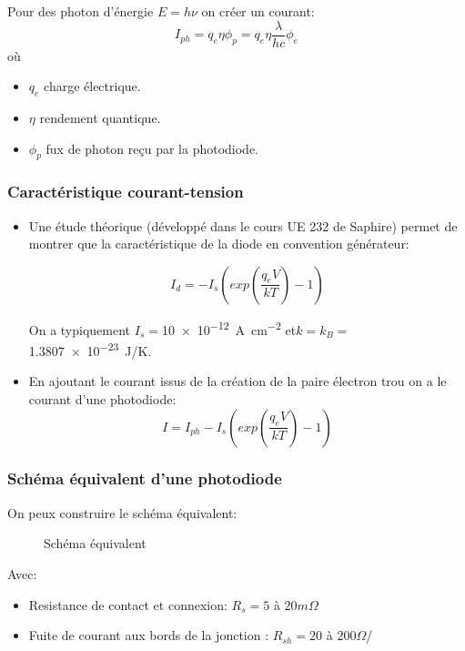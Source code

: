\documentclass[main.tex]{subfiles}
\begin{document}
Pour des photon d'énergie $E=h\nu$ on créer un courant:
\[
  I_{ph} = q_e \eta \phi_p = q_e \eta \frac{\lambda}{hc} \phi_e
\]
où
\begin{itemize}
\item $q_e$ charge électrique.
\item $\eta$ rendement quantique.
\item $\phi_p$ fux de photon reçu par la photodiode.
\end{itemize}

\subsubsection{Caractéristique courant-tension}

\begin{prop}
  \begin{itemize}
  \item Une étude théorique (développé dans le cours UE 232 de Saphire) permet
    de montrer que la caractéristique de la diode en convention générateur:

\[
  I_d = - I_s \left(exp\left(\frac{q_eV}{kT}\right)-1\right)
\]

On a typiquement $I_s = $\SI{10e-12}{A.cm^{-2}} et$k = k_B = $\SI{1.3807e-23}{J/K}.


\item  En ajoutant le courant issus de la création de la paire électron trou on a le courant d'une photodiode:
  \[
    I = I_{ph}- I_s \left(exp\left(\frac{q_eV}{kT}\right)-1\right)
  \]
\end{itemize}
\end{prop}

\subsubsection{Schéma équivalent d'une photodiode}


On peux construire le schéma équivalent:
\begin{figure}[H]
  \centering
  \caption{Schéma équivalent}
\end{figure}
Avec:
\begin{itemize}
\item Resistance de contact et connexion: $R_s=5$ à $20m\Omega$
\item Fuite de courant aux bords de la jonction : $R_{sh}=20$ à $200\Omega$/
\end{itemize}
\end{document}
